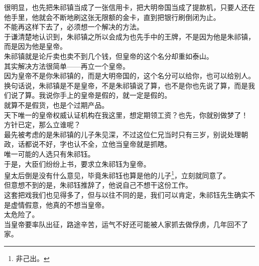 \begin{multicols}{\theparacolNo}
很明显，也先把朱祁镇当成了一张信用卡，把大明帝国当成了提款机，只要人还在他手里，他就会不断地刷这张无限额的金卡，直到把银行刷倒闭为止。\\

不能再这样下去了，必须想一个解决的方法。\\

于谦清楚地认识到，朱祁镇之所以会成为也先手中的王牌，不是因为他是朱祁镇，而是因为他是皇帝。\\

朱祁镇就是论斤卖也卖不到几个钱，但皇帝的这个名分却重如泰山。\\

其实解决方法很简单——再立一个皇帝。\\

因为皇帝不是你朱祁镇的，而是大明帝国的，这个名分可以给你，也可以给别人。\\

换句话说，朱祁镇是不是皇帝，不是朱祁镇说了算，也不是你也先说了算，而是我们说了算。我说你手上的皇帝是假的，就一定是假的。\\

就算不是假货，也是个过期产品。\\

天下唯一的皇帝权威认证机构在我这里，想定期领工资？也先，你就别做梦了！\\

方针已定，那么立谁呢？\\

最先被考虑的是朱祁镇的儿子朱见深，不过这位仁兄当时只有三岁，别说处理朝政，话都说不好，字也认不全，立他当皇帝就是抓瞎。\\

唯一可能的人选只有朱祁钰。\\

于是，大臣们纷纷上书，要求立朱祁钰为皇帝。\\

皇太后倒是没有什么意见，毕竟朱祁钰也算是他的儿子\footnote{非己出。}，立刻就同意了。\\

但意想不到的是，朱祁钰推辞了，他说自己不想干这份工作。\\

这套把戏我们也见得多了，但与以往不同的是，我们可以肯定，朱祁钰先生确实不是虚情假意，他真的不想当皇帝。\\

太危险了。\\

当皇帝要率队出征，路途辛苦，运气不好还可能被人家抓去做俘虏，几年回不了家。\\


\end{multicols}
